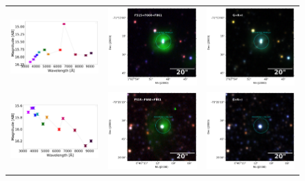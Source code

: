 \documentclass[11pt]{article}
\begin{document}
\begin{figure}[!h]
\begin{tabular}{ccc}
\includegraphics[width=0.3\linewidth, clip]{photopectrum_splus_MC0095-265990_compat-HIIRegions-smc-match-splus_aper.pdf} & \includegraphics[width=0.3\linewidth, clip]{MC0095/MC0095_F861_265990-RGB.pdf} & \includegraphics[width=0.3\linewidth, clip]{MC0095/MC0095_I_265990-RGB.pdf} \\
\includegraphics[width=0.3\linewidth, clip]{photopectrum_splus_MC0114-222322_compat-HIIRegions-smc-match-splus_aper.pdf} & \includegraphics[width=0.3\linewidth, clip]{MC0114/MC0114_F861_222322-RGB.pdf} & \includegraphics[width=0.3\linewidth, clip]{MC0114/MC0114_I_222322-RGB.pdf} \\

\end{tabular}
\end{figure}
\end{document}
